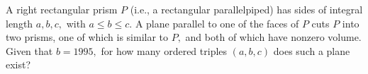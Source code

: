 A right rectangular prism $P$ (i.e., a rectangular parallelpiped) has sides of integral length $a, b, c,$ with $a\le b\le c.$  A plane parallel to one of the faces of $P$ cuts $P$ into two prisms, one of which is similar to $P,$ and both of which have nonzero volume.  Given that $b=1995,$ for how many ordered triples $(a, b, c)$ does such a plane exist?